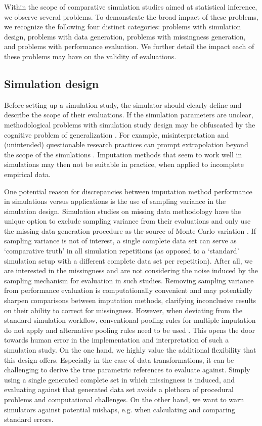 \documentclass[bimj,fleqn]{w-art}
\begin{document}
Within the scope of comparative simulation studies aimed at statistical inference, we observe several problems. To demonstrate the broad impact of these problems, we recognize the following four distinct categories: problems with simulation design, problems with data generation, problems with missingness generation, and problems with performance evaluation. We further detail the impact each of these problems may have on the validity of evaluations. 



\subsection{Simulation design}

Before setting up a simulation study, the simulator should clearly define and describe the scope of their evaluations. If the simulation parameters are unclear, methodological problems with simulation study design may be obfuscated by the cognitive problem of generalization \citep{gree17}. For example, misinterpretation and (unintended) questionable research practices can prompt extrapolation beyond the scope of the simulations \citep{gree17, pawe22}. Imputation methods that seem to work well in simulations may then not be suitable in practice, when applied to incomplete empirical data.

One potential reason for discrepancies between imputation method performance in simulations versus applications is the use of sampling variance in the simulation design. Simulation studies on missing data methodology have the unique option to exclude sampling variance from their evaluations and only use the missing data generation procedure as the source of Monte Carlo variation \citep{vink14}. If sampling variance is not of interest, a single complete data set can serve as `comparative truth' in all simulation repetitions (as opposed to a `standard' simulation setup with a different complete data set per repetition). After all, we are interested in the missingness and are not considering the noise induced by the sampling mechanism for evaluation in such studies. Removing sampling variance from performance evaluation is computationally convenient and may potentially sharpen comparisons between imputation methods, clarifying inconclusive results on their ability to correct for missingness. However, when deviating from the standard simulation workflow, conventional pooling rules for multiple imputation \citep[cf.][p. 76-77]{rubi87} do not apply and alternative pooling rules need to be used \citep{raghunathan2003multiple,vink14}. This opens the door towards human error in the implementation and interpretation of such a simulation study. On the one hand, we highly value the additional flexibility that this design offers. Especially in the case of data transformations, it can be challenging to derive the true parametric references to evaluate against. Simply using a single generated complete set in which missingness is induced, and evaluating against that generated data set avoids a plethora of procedural problems and computational challenges. On the other hand, we want to warn simulators against potential mishaps, e.g. when calculating and comparing standard errors.
\end{document}
